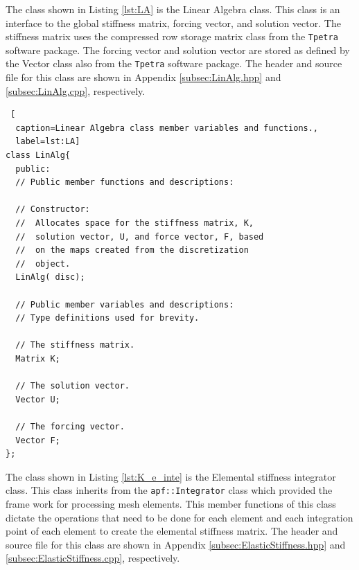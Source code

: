 \documentclass[a4paper, 12pt]{article}
\begin{document}
The class shown in Listing
\ref{lst:LA} is the
Linear Algebra
class.
This class is an interface to the global stiffness matrix, forcing
vector, and solution vector. The stiffness matrix uses the
compressed row storage matrix class from the \texttt{Tpetra}
software package. The forcing vector and solution vector are
stored as defined by the Vector class also from the \texttt{Tpetra}
software package.
The header and source file for this class are shown in Appendix
\ref{subsec:LinAlg.hpp} and
\ref{subsec:LinAlg.cpp},
respectively.

\begin{lstlisting} [
  caption=Linear Algebra class member variables and functions.,
  label=lst:LA]
class LinAlg{
  public:
  // Public member functions and descriptions:

  // Constructor:
  //  Allocates space for the stiffness matrix, K,
  //  solution vector, U, and force vector, F, based
  //  on the maps created from the discretization
  //  object.
  LinAlg( disc);

  // Public member variables and descriptions:
  // Type definitions used for brevity.

  // The stiffness matrix.
  Matrix K;

  // The solution vector.
  Vector U;

  // The forcing vector.
  Vector F;
};
\end{lstlisting}
\vspace{\baselineskip}

The class shown in Listing
\ref{lst:K_e_inte} is the
Elemental stiffness integrator
class.
This class inherits from the \texttt{apf::Integrator} class
which provided the frame work for processing mesh elements.
This member functions of this class dictate the operations that
need to be done for each element and each integration point
of each element to create the elemental stiffness matrix.
The header and source file for this class are shown in Appendix
\ref{subsec:ElasticStiffness.hpp} and
\ref{subsec:ElasticStiffness.cpp},
respectively.
\end{document}
